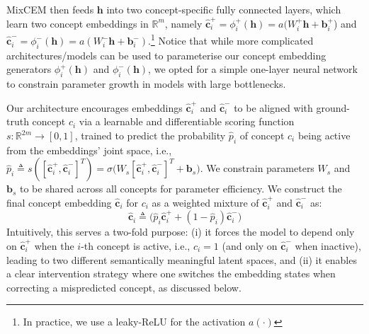 \documentclass[withindex,glossary]{cam-thesis}
\theoremstyle{plain}
\theoremstyle{definition}
\theoremstyle{remark}
\begin{document}
MixCEM then feeds $\mathbf{h}$ into two concept-specific fully connected layers, which learn two concept embeddings in $\mathbb{R}^m$, namely $\hat{\mathbf{c}}^+_i = \phi^+_i(\mathbf{h}) = a(W^+_i\mathbf{h} + \mathbf{b}^+_i$) and $\hat{\mathbf{c}}^-_i = \phi^-_i(\mathbf{h}) = a(W^-_i\mathbf{h} + \mathbf{b}^-_i)$.\footnote{In practice, we use a leaky-ReLU for the activation $a(\cdot)$} Notice that while more complicated architectures/models can be used to parameterise our concept embedding generators $\phi^+_i(\mathbf{h})$ and $\phi^-_i(\mathbf{h})$, we opted for a simple one-layer neural network to constrain parameter growth in models with large bottlenecks.

Our architecture encourages embeddings $\hat{\mathbf{c}}^+_i$ and $\hat{\mathbf{c}}^-_i$ to be aligned with ground-truth concept $c_i$ via a learnable and differentiable scoring function $s: \mathbb{R}^{2 m} \rightarrow [0, 1]$, trained to predict the probability $\hat{p}_i$ of concept $c_i$ being active from the embeddings' joint space, i.e., $\hat{p}_i \triangleq s([\hat{\mathbf{c}}^+_i, \hat{\mathbf{c}}^-_i]^T) =  \sigma\big(W_s[\hat{\mathbf{c}}^+_i, \hat{\mathbf{c}}^-_i]^T + \mathbf{b}_s\big)$. We constrain parameters $W_s$ and $\mathbf{b}_s$ to be shared across all concepts for parameter efficiency.
We construct the final concept embedding $\hat{\mathbf{c}}_i$ for $c_i$ as a weighted mixture of $\hat{\mathbf{c}}^+_i$ and $\hat{\mathbf{c}}^-_i$ as:
\[
\hat{\mathbf{c}}_i \triangleq \big(\hat{p}_i \hat{\mathbf{c}}^+_i + (1 - \hat{p}_i) \hat{\mathbf{c}}^-_i \big)
\]
Intuitively, this serves a two-fold purpose: (i) it forces the model to depend only on $\hat{\mathbf{c}}^+_i$ when the $i$-th concept is active, i.e., $c_i = 1$ (and only on $\hat{\mathbf{c}}^-_i$ when inactive), leading to two different semantically meaningful latent spaces, and (ii) it enables a clear intervention strategy where one switches the embedding states when correcting a mispredicted concept, as discussed below.
\end{document}
